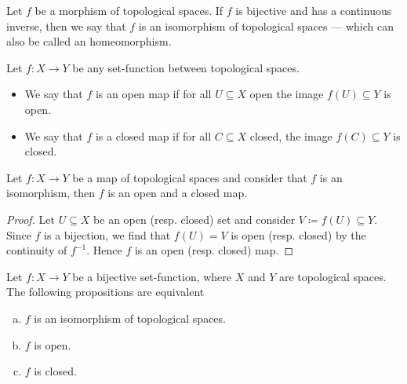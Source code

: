 \begin{definition}[Isomorphism]\label{def: homeomorphism}
Let \(f\) be a morphism of topological spaces. If \(f\) is bijective and has a
continuous inverse, then we say that \(f\) is an isomorphism of topological
spaces --- which can also be called an homeomorphism.
\end{definition}

\begin{definition}\label{def: open/closed maps}
Let \(f : X \to Y\) be any set-function between topological spaces.
\begin{itemize}\setlength\itemsep{0em}
  \item We say that \(f\) is an open map if for all \(U \subseteq X\) open the
    image \(f(U) \subseteq Y\) is open.
  \item We say that \(f\) is a closed map if for all \(C \subseteq X\) closed,
    the image \(f(C) \subseteq Y\) is closed.
\end{itemize}
\end{definition}

\begin{proposition}\label{prop:homeomorphism-is-open-closed}
Let \(f: X \to Y\) be a map of topological spaces and consider that \(f\) is an
isomorphism, then \(f\) is an open and a closed map.
\end{proposition}

\begin{proof}
Let \(U \subseteq X\) be an open (resp. closed) set and consider \(V \coloneq f(U)
\subseteq Y\).  Since \(f\) is a bijection, we find that \(f(U) = V\) is open
(resp. closed) by the continuity of \(f^{-1}\). Hence \(f\) is an open (resp.
closed) map.
\end{proof}

\begin{corollary}\label{cor:bij-iso-open-closed}
Let \(f: X \to Y\) be a bijective set-function, where \(X\) and \(Y\) are
topological spaces. The following propositions are equivalent
\begin{enumerate}[(a)]\setlength\itemsep{0em}
\item \(f\) is an isomorphism of topological spaces.
\item \(f\) is open.
\item \(f\) is closed.
\end{enumerate}
\end{corollary}

